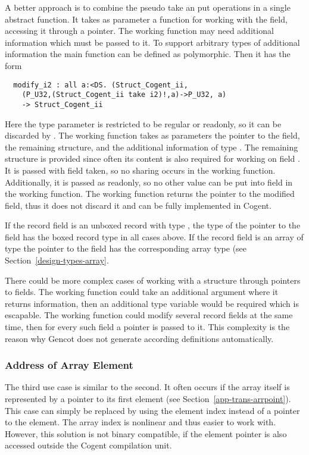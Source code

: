 A better approach is to combine the pseudo take an put operations in a single abstract function. It takes
as parameter a function for working with the field, accessing it through a pointer. The working function
may need additional information which must be passed to it. To support arbitrary types of additional information
the main function can be defined as polymorphic. Then it has the form
\begin{verbatim}
  modify_i2 : all a:<DS. (Struct_Cogent_ii,
    (P_U32,(Struct_Cogent_ii take i2)!,a)->P_U32, a)
    -> Struct_Cogent_ii
\end{verbatim}
Here the type parameter  is restricted to be regular or readonly, so it can be discarded by .
The working function takes as parameters the pointer to the field, the remaining structure, and the additional information
of type . The remaining structure is provided since often its content is also required for working on 
field . It is passed with field  taken, so no sharing occurs in the working function. Additionally,
it is passed as readonly, so no other value can be put into field  in the working function. The working
function returns the pointer to the modified field, thus it does not discard it and can be fully implemented in Cogent.

If the record field is an unboxed record with type , the type of the pointer to the field has the boxed record
type  in all cases above. If the record field is an array of type  the pointer to the field
has the corresponding array type  (see Section~\ref{design-types-array}.

There could be more complex cases of working with a structure through pointers to fields. The working function could
take an additional argument where it returns information, then an additional type variable  would be required
which is escapable. The working function could modify several record fields at the same time, then for every such field
a pointer is passed to it. This complexity is the reason why Gencot does not generate according definitions automatically.

\subsubsection{Address of Array Element}

The third use case is similar to the second. It often occurs if the array itself is represented by a pointer to its first
element (see Section~\ref{app-trans-arrpoint}). This case can simply be replaced by using the element index instead of a 
pointer to the element. The array index is nonlinear and thus easier to work with. However, this solution is not binary
compatible, if the element pointer is also accessed outside the Cogent compilation unit.

